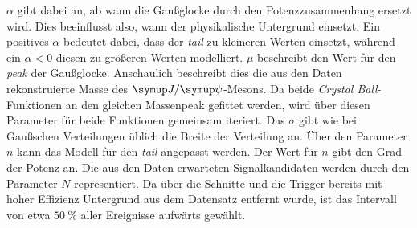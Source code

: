 %
$\alpha$ gibt dabei an, ab wann die Gaußglocke durch den Potenzzusammenhang ersetzt wird. Dies beeinflusst also, wann der physikalische Untergrund einsetzt. Ein positives $\alpha$ bedeutet dabei, dass der \textit{tail} zu kleineren Werten einsetzt, während ein $\alpha<0$ diesen zu größeren Werten modelliert. $\mu$ beschreibt den Wert für den \textit{peak} der Gaußglocke. Anschaulich beschreibt dies die aus den Daten rekonstruierte Masse des $\jpsi$-Mesons. Da beide \textit{Crystal Ball}-Funktionen an den gleichen Massenpeak gefittet werden, wird über diesen Parameter für beide Funktionen gemeinsam iteriert. Das $\sigma$ gibt wie bei Gaußschen Verteilungen üblich die Breite der Verteilung an. Über den Parameter $n$ kann das Modell für den \textit{tail} angepasst werden. Der Wert für $n$ gibt den Grad der Potenz an. Die aus den Daten erwarteten Signalkandidaten werden durch den Parameter $N$ representiert. Da über die Schnitte und die Trigger bereits mit hoher Effizienz Untergrund aus dem Datensatz entfernt wurde, ist das Intervall von etwa $\SI{50}{\percent}$ aller Ereignisse aufwärts gewählt.
